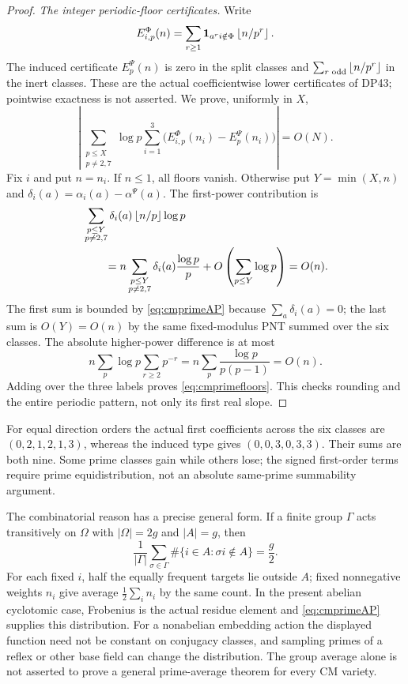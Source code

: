 \documentclass[11pt,a4paper]{article}
\theoremstyle{definition}\newtheorem{remark}[theorem]{Remark}
\begin{document}
\begin{proof}
\emph{The integer periodic-floor certificates.}
Write
\[
 E_{i,p}^\Phi(n)
       =\sum_{r\ge1}\mathbf1_{a^ri\notin\Phi}
          \left\lfloor n/p^r\right\rfloor.
\]
The induced certificate $E_p^\Psi(n)$ is zero in the split classes and
$\sum_{r\text{ odd}}\left\lfloor n/p^r\right\rfloor$ in the inert classes.
These are the actual coefficientwise lower certificates of DP43; pointwise exactness is not asserted.
We prove, uniformly in $X$,
\begin{equation}\label{eq:cmprimefloors}
 \left|\sum_{\substack{p\le X\\p\ne2,7}}\log p
       \sum_{i=1}^3\bigl(E_{i,p}^\Phi(n_i)-E_p^\Psi(n_i)\bigr)\right|
       =O(N).
\end{equation}
Fix $i$ and put $n=n_i$. If $n\le1$, all floors vanish.
Otherwise put $Y=\min(X,n)$ and $\delta_i(a)=\alpha_i(a)-\alpha^\Psi(a)$.
The first-power contribution is
\begin{align*}
 &\sum_{\substack{p\le Y\\p\ne2,7}}
       \delta_i(a)\left\lfloor n/p\right\rfloor\log p\\
 &\qquad=n\sum_{\substack{p\le Y\\p\ne2,7}}
       \delta_i(a)\frac{\log p}{p}
       +O\left(\sum_{p\le Y}\log p\right)=O(n).
\end{align*}
The first sum is bounded by \eqref{eq:cmprimeAP} because $\sum_a\delta_i(a)=0$; the last sum is $O(Y)=O(n)$ by the same fixed-modulus PNT summed over the six classes.
The absolute higher-power difference is at most
\[
 n\sum_p\log p\sum_{r\ge2}p^{-r}
       =n\sum_p\frac{\log p}{p(p-1)}=O(n).
\]
Adding over the three labels proves \eqref{eq:cmprimefloors}.
This checks rounding and the entire periodic pattern, not only its first real slope.
\end{proof}

For equal direction orders the actual first coefficients across the six classes are $(0,2,1,2,1,3)$, whereas the induced type gives $(0,0,3,0,3,3)$. Their sums are both nine. Some prime classes gain while others lose; the signed first-order terms require prime equidistribution, not an absolute same-prime summability argument.

The combinatorial reason has a precise general form. If a finite group $\Gamma$ acts transitively on $\Omega$ with $|\Omega|=2g$ and $|A|=g$, then
\[
 \frac1{|\Gamma|}\sum_{\sigma\in\Gamma}
       \#\{i\in A:\sigma i\notin A\}=\frac g2.
\]
For each fixed $i$, half the equally frequent targets lie outside $A$; fixed nonnegative weights $n_i$ give average $\tfrac12\sum_i n_i$ by the same count.
In the present abelian cyclotomic case, Frobenius is the actual residue element and \eqref{eq:cmprimeAP} supplies this distribution. For a nonabelian embedding action the displayed function need not be constant on conjugacy classes, and sampling primes of a reflex or other base field can change the distribution. The group average alone is not asserted to prove a general prime-average theorem for every CM variety.
\end{document}
